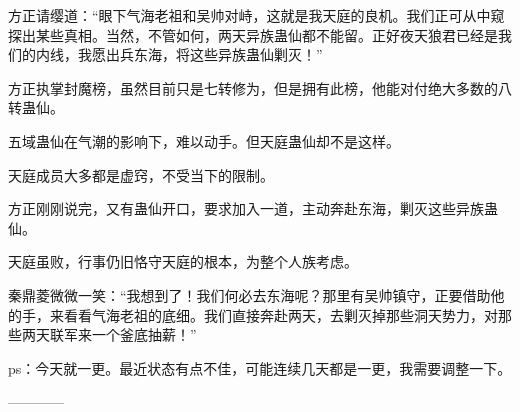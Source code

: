 \begin{this_body}
方正请缨道：“眼下气海老祖和吴帅对峙，这就是我天庭的良机。我们正可从中窥探出某些真相。当然，不管如何，两天异族蛊仙都不能留。正好夜天狼君已经是我们的内线，我愿出兵东海，将这些异族蛊仙剿灭！”

方正执掌封魔榜，虽然目前只是七转修为，但是拥有此榜，他能对付绝大多数的八转蛊仙。

五域蛊仙在气潮的影响下，难以动手。但天庭蛊仙却不是这样。

天庭成员大多都是虚窍，不受当下的限制。

方正刚刚说完，又有蛊仙开口，要求加入一道，主动奔赴东海，剿灭这些异族蛊仙。

天庭虽败，行事仍旧恪守天庭的根本，为整个人族考虑。

秦鼎菱微微一笑：“我想到了！我们何必去东海呢？那里有吴帅镇守，正要借助他的手，来看看气海老祖的底细。我们直接奔赴两天，去剿灭掉那些洞天势力，对那些两天联军来一个釜底抽薪！”

ps：今天就一更。最近状态有点不佳，可能连续几天都是一更，我需要调整一下。

------------

\end{this_body}

